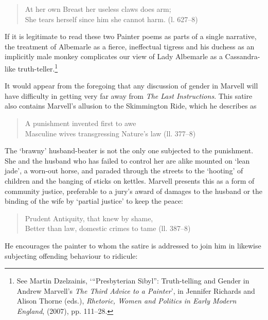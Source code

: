 ﻿\documentclass[12pt]{article}
\newcommand{\citedtitle}[1]{\textit{#1}}
\begin{document}
\begin{verse}
At her own Breast her useless claws does arm;\\
She tears herself since him she cannot harm. (l. 627–8)
\end{verse}
If it is legitimate to read these two Painter poems as parts of a single narrative,
the treatment of Albemarle as a fierce, ineffectual tigress and his duchess as
an implicitly male monkey complicates our view of Lady Albemarle as a
Cassandra-like truth-teller.\footnote{See Martin Dzelzainis,
‘“Presbyterian Sibyl”: Truth-telling and Gender in Andrew Marvell’s \citedtitle{The
Third Advice to a Painter}’, in Jennifer Richards and Alison Thorne (eds.), \citedtitle{Rhetoric,
Women and Politics in Early Modern England}, (2007), pp. 111–28.}

It
would appear from the foregoing that any discussion of gender in Marvell will
have difficulty in getting very far away from \citedtitle{The Last Instructions}. This satire also
contains Marvell’s allusion to the Skimmington Ride, which he describes as

\begin{verse}
A punishment invented first to awe\\
Masculine wives transgressing Nature’s law (ll. 377–8)
\end{verse}
The ‘brawny’ husband-beater is not the only one subjected to the punishment. She
and the husband who has failed to control her are alike mounted on ‘lean jade’,
a worn-out horse, and paraded through the streets to the ‘hooting’ of children
and the banging of sticks on kettles. Marvell presents this as a form of
community justice, preferable to a jury’s award of damages to the husband or
the binding of the wife by ‘partial justice’ to keep the peace:

\begin{verse}
Prudent Antiquity, that knew by shame,\\
Better than law, domestic crimes to tame (ll. 387–8)
\end{verse}
He encourages the painter to whom the satire is addressed to join him in likewise
subjecting offending behaviour to ridicule:
\end{document}
